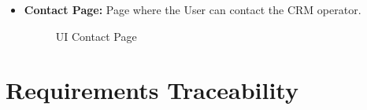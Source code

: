 \documentclass[a4paper]{article}
\begin{document}
\begin {itemize}
\begin{figure}[h!]
\centering
\vspace*{\fill}
\noindent{}%
\caption {UI Email Page}
\vspace*{0.2cm}
\end{figure}
\pagebreak
\item \textbf{Contact Page:} Page where the User can contact the CRM operator.
\begin{figure}[h!]
\centering
\vspace*{\fill}
\noindent{}%
\caption {UI Contact Page}
\vspace*{0.2cm}
\end{figure}
\end{itemize}

\newpage
\section{Requirements Traceability}
\end{document}
